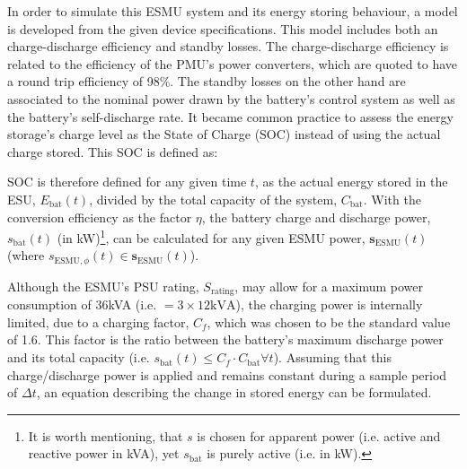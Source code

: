 In order to simulate this ESMU system and its energy storing behaviour, a model is developed from the given device specifications.
This model includes both an charge-discharge efficiency and standby losses.
The charge-discharge efficiency is related to the efficiency of the PMU's power converters, which are quoted to have a round trip efficiency of 98\%.
The standby losses on the other hand are associated to the nominal power drawn by the battery's control system as well as the battery's self-discharge rate.
It became common practice to assess the energy storage's charge level as the State of Charge (SOC) instead of using the actual charge stored.
This SOC is defined as:



\nomenclature{$\eta$}{Round-trip efficiency of power electronics, where $\eta \in (0, 1]$ (Chapter \ref{ch1})}


SOC is therefore defined for any given time $t$, as the actual energy stored in the ESU, $E_\text{bat}(t)$, divided by the total capacity of the system, $C_\text{bat}$.
With the conversion efficiency as the factor $\eta$, the battery charge and discharge power, $s_\text{bat}(t)$ (in kW)\footnote[1]{It is worth mentioning, that $s$ is chosen for apparent power (i.e. active and reactive power in kVA), yet $s_\text{bat}$ is purely active (i.e. in kW).}, can be calculated for any given ESMU power, $\textbf{s}_\text{ESMU}(t)$ (where $s_{\text{ESMU},\phi}(t) \in \textbf{s}_\text{ESMU}(t)$).




Although the ESMU's PSU rating, $S_\text{rating}$, may allow for a maximum power consumption of 36kVA (i.e. $=3\times12\text{kVA}$), the charging power is internally limited, due to a charging factor, $C_f$, which was chosen to be the standard value of 1.6.
This factor is the ratio between the battery's maximum discharge power and its total capacity (i.e. $s_\text{bat}(t) \leq C_f \cdot C_\text{bat} \forall t$).
Assuming that this charge/discharge power is applied and remains constant during a sample period of $\Delta t$, an equation describing the change in stored energy can be formulated.

